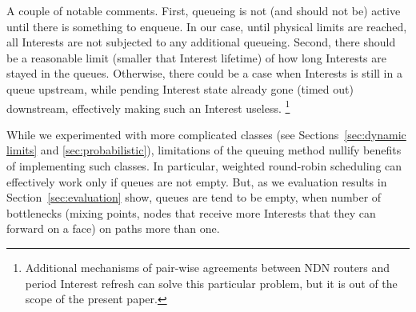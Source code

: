 A couple of notable comments.
First, queueing is not (and should not be) active until there is something to enqueue.
In our case, until physical limits are reached, all Interests are not subjected to any additional queueing.
Second, there should be a reasonable limit (smaller that Interest lifetime) of how long Interests are stayed in the queues.
Otherwise, there could be a case when Interests is still in a queue upstream, while pending Interest state already gone (timed out) downstream, effectively making such an Interest useless.%
\footnote{Additional mechanisms of pair-wise agreements between NDN routers and period Interest refresh can solve this particular problem, but it is out of the scope of the present paper.}

While we experimented with more complicated classes (see Sections~\ref{sec:dynamic limits} and \ref{sec:probabilistic}), limitations of the queuing method nullify benefits of implementing such classes.
In particular, weighted round-robin scheduling can effectively work only if queues are not empty.
But, as we evaluation results in Section~\ref{sec:evaluation} show, queues are tend to be empty, when number of bottlenecks (mixing points, nodes that receive more Interests that they can forward on a face) on paths more than one.


